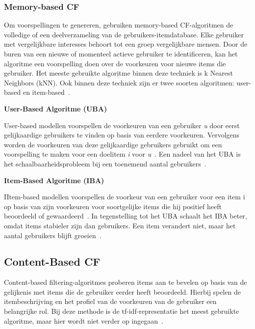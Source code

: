 \subsubsection{Memory-based CF}
Om voorspellingen te genereren, gebruiken memory-based CF-algoritmen de volledige of een deelverzameling van de gebruikers-itemdatabase. Elke gebruiker met vergelijkbare interesses behoort tot een groep vergelijkbare mensen. Door de buren van een nieuwe of momenteel actieve gebruiker te identificeren, kan het algoritme een voorspelling doen over de voorkeuren voor nieuwe items die gebruiker. Het meeste gebruikte algoritme binnen deze techniek is k Nearest Neighbors (kNN). Ook binnen deze techniek zijn er twee soorten algoritmen: user-based en item-based~\autocite{Thorat2015}.\par
\medskip
\textbf{User-Based Algoritme (UBA)}\par
User-based modellen voorspellen de voorkeuren van een gebruiker \textit{u} door eerst gelijkaardige gebruikers te vinden op basis van eerdere voorkeuren. Vervolgens worden de voorkeuren van deze gelijkaardige gebruikers gebruikt om een voorspelling te maken voor een doelitem \textit{i} voor \textit{u}~\autocite{Dong2022}. Een nadeel van het UBA is het schaalbaarheidsprobleem bij een toenemend aantal gebruikers~\autocite{Thorat2015}.\par
\medskip
\textbf{Item-Based Algoritme (IBA)}\par
IItem-based modellen voorspellen de voorkeur van een gebruiker voor een item i op basis van zijn voorkeuren voor soortgelijke items die hij positief heeft beoordeeld of gewaardeerd~\autocite{Thorat2015,Dong2022}. In tegenstelling tot het UBA schaalt het IBA beter, omdat items stabieler zijn dan gebruikers. Een item verandert niet, maar het aantal gebruikers blijft groeien~\autocite{Thorat2015}.

\subsection{Content-Based CF}
Content-based filtering-algoritmes proberen items aan te bevelen op basis van de gelijkenis met items die de gebruiker eerder heeft beoordeeld. Hierbij spelen de itembeschrijving en het profiel van de voorkeuren van de gebruiker een belangrijke rol. Bij deze methode is de tf-idf-representatie het meest gebruikte algoritme, maar hier wordt niet verder op ingegaan~\autocite{Thorat2015}.

